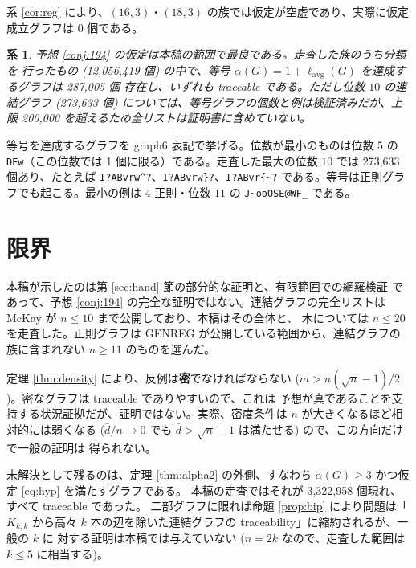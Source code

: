 \documentclass[paper=a4,fontsize=10.5pt,jafontsize=10.5pt]{jlreq}
\theoremstyle{plain}
\newtheorem{corollary}[theorem]{系}
\theoremstyle{definition}
\begin{document}
系 \ref{cor:reg} により、$(16, 3)$・$(18, 3)$ の族では仮定が空虚であり、実際に仮定成立グラフは 0 個である。

\begin{corollary}\label{cor:eq}
予想 \ref{conj:194} の仮定は本稿の範囲で最良である。走査した族のうち分類を
行ったもの (12,056,419 個) の中で、等号
$\alpha(G) = 1 + \ell_{\mathrm{avg}}(G)$ を達成するグラフは 287,005 個
存在し、いずれも traceable である。ただし位数 $10$ の連結グラフ (273,633 個) については、等号グラフの個数と例は検証済みだが、上限 200,000 を超えるため全リストは証明書に含めていない。
\end{corollary}

等号を達成するグラフを graph6 表記で挙げる。位数が最小のものは位数 $5$ の \texttt{DEw}（この位数では 1 個に限る）である。走査した最大の位数 $10$ では 273,633 個あり、たとえば \texttt{I?ABvrw\textasciicircum{}?}、\texttt{I?ABvrw\}?}、\texttt{I?ABvr\{\textasciitilde{}?} である。等号は正則グラフでも起こる。最小の例は $4$-正則・位数 $11$ の \texttt{J\textasciitilde{}ooOSE@WF\_} である。

\section{限界}\label{sec:limit}

本稿が示したのは第 \ref{sec:hand} 節の部分的な証明と、有限範囲での網羅検証
であって、予想 \ref{conj:194} の完全な証明ではない。連結グラフの完全リストは
McKay \cite{mckay} が $n \le 10$ まで公開しており、本稿はその全体と、
木については $n \le 20$ を走査した。正則グラフは
GENREG \cite{genreg} が公開している範囲から、連結グラフの族に含まれない
$n \ge 11$ のものを選んだ。

定理 \ref{thm:density} により、反例は\textbf{密}でなければならない
($m > n(\sqrt{n}-1)/2$)。密なグラフは traceable でありやすいので、これは
予想が真であることを支持する状況証拠だが、証明ではない。実際、密度条件は
$n$ が大きくなるほど相対的には弱くなる ($\bar{d}/n \to 0$ でも
$\bar{d} > \sqrt{n}-1$ は満たせる) ので、この方向だけで一般の証明は
得られない。

未解決として残るのは、定理 \ref{thm:alpha2} の外側、すなわち
$\alpha(G) \ge 3$ かつ仮定 \eqref{eq:hyp} を満たすグラフである。
本稿の走査ではそれが 3,322,958 個現れ、すべて traceable であった。
二部グラフに限れば命題 \ref{prop:bip} により問題は「$K_{k,k}$ から高々
$k$ 本の辺を除いた連結グラフの traceability」に縮約されるが、一般の $k$ に
対する証明は本稿では与えていない ($n = 2k$ なので、走査した範囲は
$k \le 5$ に相当する)。
\end{document}
